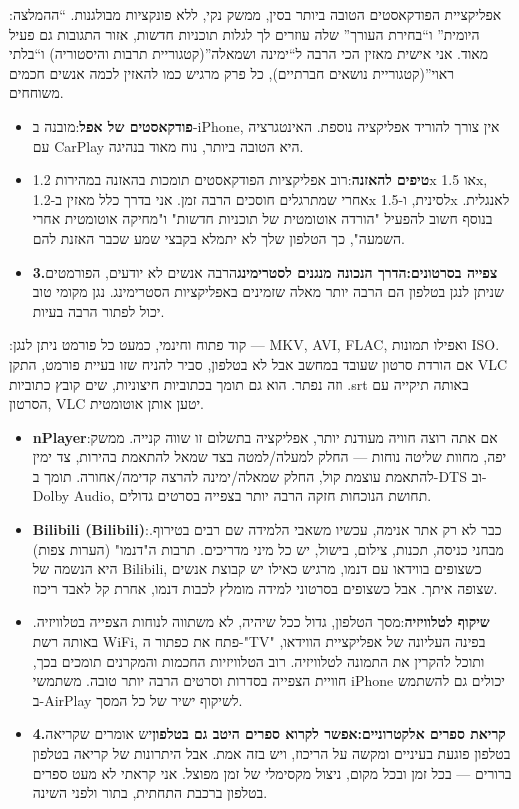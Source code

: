 :אפליקציית הפודקאסטים הטובה ביותר בסין, ממשק נקי, ללא פונקציות מבולגנות. “ההמלצה היומית” ו“בחירת העורך” שלה עוזרים לך לגלות תוכניות חדשות, אזור התגובות גם פעיל מאוד. אני אישית מאזין הכי הרבה ל“ימינה ושמאלה”(קטגוריית תרבות והיסטוריה) ו“בלתי ראוי”(קטגוריית נושאים חברתיים), כל פרק מרגיש כמו להאזין לכמה אנשים חכמים משוחחים.

\begin{itemize}
  \item \textbf{פודקאסטים של אפל}:מובנה ב-iPhone, אין צורך להוריד אפליקציה נוספת. האינטגרציה עם CarPlay היא הטובה ביותר, נוח מאוד בנהיגה.
  \item \textbf{טיפים להאזנה}:רוב אפליקציות הפודקאסטים תומכות בהאזנה במהירות 1.2x או 1.5x, אחרי שמתרגלים חוסכים הרבה זמן. אני בדרך כלל מאזין ב-1.2x לסינית, ו-1.5x לאנגלית. בנוסף חשוב להפעיל "הורדה אוטומטית של תוכניות חדשות" ו"מחיקה אוטומטית אחרי השמעה", כך הטלפון שלך לא יתמלא בקבצי שמע שכבר האזנת להם.
  \item \textbf{3.צפייה בסרטונים:הדרך הנכונה מנגנים לסטרימינג}הרבה אנשים לא יודעים, הפורמטים שניתן לנגן בטלפון הם הרבה יותר מאלה שזמינים באפליקציות הסטרימינג. נגן מקומי טוב יכול לפתור הרבה בעיות.
\end{itemize}


:קוד פתוח וחינמי, כמעט כל פורמט ניתן לנגן — MKV, AVI, FLAC, ואפילו תמונות ISO. אם הורדת סרטון שעובד במחשב אבל לא בטלפון, סביר להניח שזו בעיית פורמט, התקן VLC וזה נפתר. הוא גם תומך בכתוביות חיצוניות, שים קובץ כתוביות .srt באותה תיקייה עם הסרטון, VLC יטען אותן אוטומטית.

\begin{itemize}
  \item \textbf{nPlayer}:אם אתה רוצה חוויה מעודנת יותר, אפליקציה בתשלום זו שווה קנייה. ממשק יפה, מחוות שליטה נוחות — החלק למעלה/למטה בצד שמאל להתאמת בהירות, צד ימין להתאמת עוצמת קול, החלק שמאלה/ימינה להרצה קדימה/אחורה. תומך ב-DTS וב-Dolby Audio, תחושת הנוכחות חזקה הרבה יותר בצפייה בסרטים גדולים.
  \item \textbf{Bilibili (Bilibili)}:כבר לא רק אתר אנימה, עכשיו משאבי הלמידה שם רבים בטירוף. מבחני כניסה, תכנות, צילום, בישול, יש כל מיני מדריכים. תרבות ה"דנמו" (הערות צפות) היא הנשמה של Bilibili, כשצופים בווידאו עם דנמו, מרגיש כאילו יש קבוצת אנשים שצופה איתך. אבל כשצופים בסרטוני למידה מומלץ לכבות דנמו, אחרת קל לאבד ריכוז.
  \item \textbf{שיקוף לטלוויזיה}:מסך הטלפון, גדול ככל שיהיה, לא משתווה לנוחות הצפייה בטלוויזיה. באותה רשת WiFi, פתח את כפתור ה-"TV" בפינה העליונה של אפליקציית הווידאו, ותוכל להקרין את התמונה לטלוויזיה. רוב הטלוויזיות החכמות והמקרנים תומכים בכך, חוויית הצפייה בסדרות וסרטים הרבה יותר טובה. משתמשי iPhone יכולים גם להשתמש ב-AirPlay לשיקוף ישיר של כל המסך.
  \item \textbf{4.קריאת ספרים אלקטרוניים:אפשר לקרוא ספרים היטב גם בטלפון}יש אומרים שקריאה בטלפון פוגעת בעיניים ומקשה על הריכוז, ויש בזה אמת. אבל היתרונות של קריאה בטלפון ברורים — בכל זמן ובכל מקום, ניצול מקסימלי של זמן מפוצל. אני קראתי לא מעט ספרים בטלפון ברכבת התחתית, בתור ולפני השינה.
\end{itemize}

